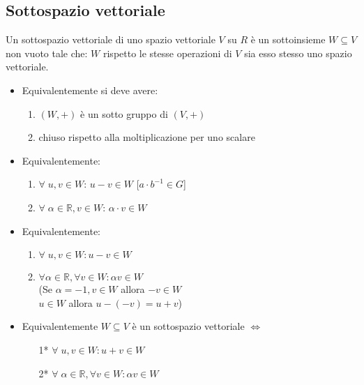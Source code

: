 \subsection{Sottospazio vettoriale}
Un sottospazio vettoriale di uno spazio vettoriale \(V\) su \(R\) è un sottoinsieme \(W\subseteq V\) non vuoto tale che: \(W\) rispetto le stesse operazioni di \(V\) sia esso stesso uno spazio vettoriale.
\\
\begin{itemize}

	\item Equivalentemente si deve avere:

	\begin{enumerate}

		\item \((W,+)\) è un sotto gruppo di \((V,+)\)

		\item chiuso rispetto alla moltiplicazione per uno scalare

	\end{enumerate}

	\item Equivalentemente:

	\begin{enumerate}

		\item \(\forall\;u,v\in W\): \(u-v\in W\)  [\(a\cdot b^{-1}\in G\)]

		\item \(\forall\;\alpha\in\mathbb{R},v\in W\): \(\alpha\cdot v\in W\)

	\end{enumerate}	

	\item Equivalentemente:

	\begin{enumerate}

		\item \(\forall\; u,v\in W: u-v\in W\)

		\item \(\forall\alpha\in\mathbb{R},\forall v\in W: \alpha v\in W\)
		\\(Se \(\alpha= -1,v\in W\) allora \(-v\in W\)
		\\\(u\in W\) allora \(u-(-v)=u+v\))
		
	\end{enumerate}

	\item Equivalentemente \(W\subseteq V\) è un sottospazio vettoriale \(\Leftrightarrow\)

	\begin{enumerate}

		\item [1*] \(\forall\;u,v\in W: u+v\in W\)

		\item [2*] \(\forall\;\alpha\in\mathbb{R},\forall v\in W: \alpha v\in W\)
		
	\end{enumerate}
	
\end{itemize}

